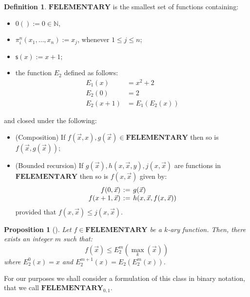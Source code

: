 \documentclass[manuscript,screen]{acmart}
\newcommand{\dfn}{:=}
\newtheorem{prop}[thm]{Proposition}
\theoremstyle{definition}
\newtheorem{defn}[thm]{Definition}
\theoremstyle{remark}
\newcommand{\Nat}{\mathbb{N}}
\newcommand{\elementary}{\mathbf{ELEMENTARY}}
\newcommand{\f}{\mathbf{F}}
\newcommand{\felementary}{\f\elementary}
\begin{document}
\begin{defn} \label{defn:felementary}  $\felementary$ is the smallest set of functions containing:
\begin{itemize}
    \item $0()\dfn 0 \in \Nat$,  
    \item $\pi^n_i(x_1, \ldots, x_{n})\dfn x_j$, whenever $1 \leq j \leq n$;
    \item $\mathsf{s}(x)\dfn x+1$;
    \item the function $E_2$ defined as follows:
    \begin{equation*}
    \begin{aligned}
            E_1(x)&=x^2+2\\
             E_2(0)&=2\\
             E_2(x+1)&=E_1(E_2(x))
    \end{aligned}
    \end{equation*}
    \end{itemize}
    and closed under the following:
    \begin{itemize}
    \item (Composition) If $f(\vec x, x), g(\vec x)\in \felementary$ then so is $f(\vec x, g(\vec x))$; 
    \item (Bounded recursion) If $g(\vec x), h (x,\vec x,y),  j(x, \vec x)$ are functions in $ \felementary$ then so is $f(x, \vec x)$ given by:
    \begin{equation*}
    \arraycolsep=2pt
        \begin{array}{rcl}
              f(0, \vec{x})&\dfn& g(\vec{x})\\
              f(x+1, \vec{x})&\dfn& h(x, \vec{x}, f(x, \vec{x}))
        \end{array}
    \end{equation*}
    provided that $f(x, \vec{x})\leq j(x, \vec{x})$.
\end{itemize}
\end{defn}


\begin{prop}[\cite{rose1984subrecursion}]\label{prop:rose} Let $f\in \felementary$ be a $k$-ary function. Then, there exists an integer $m$ such that:
\begin{equation*}
    f(\vec{x})\leq E^m_{2}(\max_k(\vec{x}))
\end{equation*}
where $E^0_{2}(x)=x$ and $E^{m+1}_{2}(x)=E_2(E^{m}_{2}(x))$.
\end{prop}

For our purposes we shall consider a  formulation of this class in binary notation, that we call  $\felementary_{0,1}$. 
\end{document}
